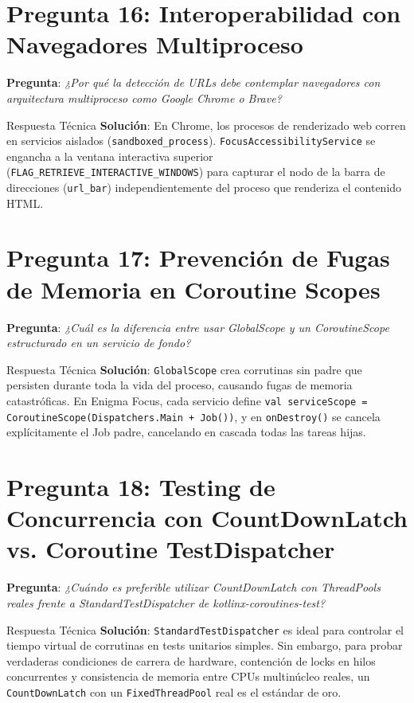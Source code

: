 \documentclass[11pt,a4paper,oneside]{report}
\begin{document}
\newpage

\section{Pregunta 16: Interoperabilidad con Navegadores Multiproceso}
\textbf{Pregunta}: \textit{¿Por qué la detección de URLs debe contemplar navegadores con arquitectura multiproceso como Google Chrome o Brave?}
\begin{starbox}{Respuesta Técnica}
\textbf{Solución}: En Chrome, los procesos de renderizado web corren en servicios aislados (\texttt{sandboxed\_process}). \texttt{FocusAccessibilityService} se engancha a la ventana interactiva superior (\texttt{FLAG\_RETRIEVE\_INTERACTIVE\_WINDOWS}) para capturar el nodo de la barra de direcciones (\texttt{url\_bar}) independientemente del proceso que renderiza el contenido HTML.
\end{starbox}

\section{Pregunta 17: Prevención de Fugas de Memoria en Coroutine Scopes}
\textbf{Pregunta}: \textit{¿Cuál es la diferencia entre usar GlobalScope y un CoroutineScope estructurado en un servicio de fondo?}
\begin{starbox}{Respuesta Técnica}
\textbf{Solución}: \texttt{GlobalScope} crea corrutinas sin padre que persisten durante toda la vida del proceso, causando fugas de memoria catastróficas. En Enigma Focus, cada servicio define \texttt{val serviceScope = CoroutineScope(Dispatchers.Main + Job())}, y en \texttt{onDestroy()} se cancela explícitamente el Job padre, cancelando en cascada todas las tareas hijas.
\end{starbox}

\section{Pregunta 18: Testing de Concurrencia con CountDownLatch vs. Coroutine TestDispatcher}
\textbf{Pregunta}: \textit{¿Cuándo es preferible utilizar CountDownLatch con ThreadPools reales frente a StandardTestDispatcher de kotlinx-coroutines-test?}
\begin{starbox}{Respuesta Técnica}
\textbf{Solución}: \texttt{StandardTestDispatcher} es ideal para controlar el tiempo virtual de corrutinas en tests unitarios simples. Sin embargo, para probar verdaderas condiciones de carrera de hardware, contención de locks en hilos concurrentes y consistencia de memoria entre CPUs multinúcleo reales, un \texttt{CountDownLatch} con un \texttt{FixedThreadPool} real es el estándar de oro.
\end{starbox}
\end{document}
